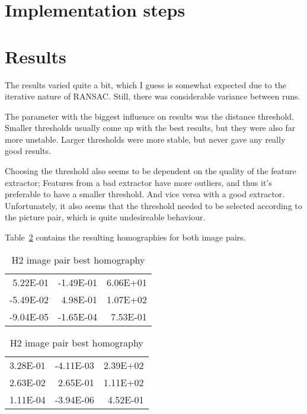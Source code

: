 \section{Implementation steps}


\section{Results}

The results varied quite a bit, which I guess is somewhat expected due to the
iterative nature of RANSAC\@. Still, there was considerable variance between
runs.

The parameter with the biggest influence on results was the distance threshold.
Smaller thresholds usually come up with the best results, but they were also
far more unstable. Larger thresholds were more stable, but never gave any
really good results.

Choosing the threshold also seems to be dependent on the quality of the feature
extractor; Features from a bad extractor have more outliers, and thus it's
preferable to have a smaller threshold. And vice versa with a good extractor.
Unfortunately, it also seems that the threshold needed to be selected according
to the picture pair, which is quite undesireable behaviour.

Table~\ref{tab:homographies} contains the resulting homographies for both image
pairs.

\begin{table}[H]
  \caption{The best homographies for both image pairs, obtained by the RANSAC
  algorithm}\label{tab:homographies}
  \begin{minipage}{.5\linewidth}
    \caption{H1 image pair best homography}
    \centering
    \begin{tabular}{rrr}
      \toprule
       5.22E-01 & -1.49E-01 & 6.06E+01 \\
      -5.49E-02 &  4.98E-01 & 1.07E+02 \\
      -9.04E-05 & -1.65E-04 & 7.53E-01 \\
      \bottomrule
    \end{tabular}
  \end{minipage}
  \begin{minipage}{.5\linewidth}
    \centering
    \caption{H2 image pair best homography}
    \begin{tabular}{rrr}
      \toprule
      3.28E-01 & -4.11E-03 & 2.39E+02 \\
      2.63E-02 &  2.65E-01 & 1.11E+02 \\
      1.11E-04 & -3.94E-06 & 4.52E-01 \\
      \bottomrule
    \end{tabular}
  \end{minipage} 
\end{table}

